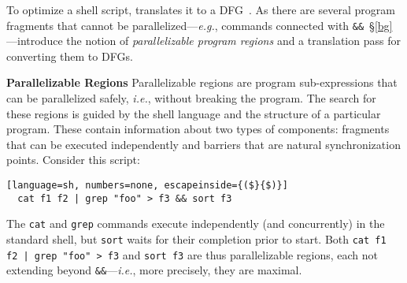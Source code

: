 \documentclass[letterpaper,twocolumn,10pt]{article}
\newcommand{\eg}{{\em e.g.}, }
\newcommand{\ie}{{\em i.e.}, }
\newcommand{\heading}[1]{\vspace{4pt}\noindent\textbf{#1}\enspace}
\newcommand{\ttt}[1]{\texttt{#1}}
\newcommand{\kk}[1]{[{\color{magenta}kk: #1}]}
\begin{document}
To optimize a shell script, \sys translates it to a DFG~.
As there are several program fragments that cannot be parallelized---\eg commands connected with \ttt{\&\&}~\S\ref{bg}---\sys introduce the notion of \emph{parallelizable program regions} and a translation pass for converting them to DFGs.




\heading{Parallelizable Regions}
%
%
Parallelizable regions are program sub-expressions that can be parallelized safely, \ie without breaking the program.
The search for these regions is guided by the shell language and the structure of a particular program.
These contain information about two types of components:
  fragments that can be executed independently and barriers that are natural synchronization points. %
Consider this script:

\begin{lstlisting}[language=sh, numbers=none, escapeinside={($}{$)}]
  cat f1 f2 | grep "foo" > f3 && sort f3 
\end{lstlisting}

\noindent
The \ttt{cat} and \ttt{grep} commands execute independently (and concurrently) in the standard shell, but \ttt{sort} waits for their completion prior to start.
Both \ttt{cat f1 f2 | grep "foo" > f3} and \ttt{sort f3} are thus parallelizable regions, each not extending beyond \ttt{\&\&}---\ie more precisely, they are maximal.
\end{document}
